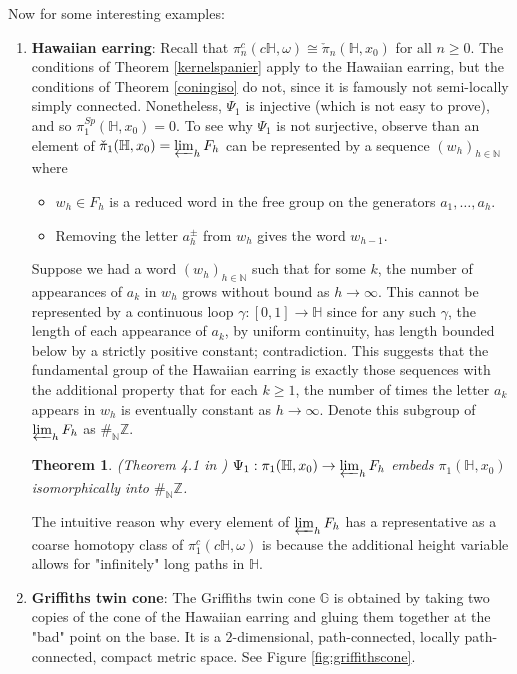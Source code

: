 \documentclass[a4paper,11pt]{article}
\theoremstyle{definition}
\theoremstyle{plain}
\newtheorem{theorem}[definition]{Theorem}
\theoremstyle{remark}
\begin{document}
{Now for some interesting examples:

\begin{enumerate}
\item \textbf{Hawaiian earring}: Recall that $\pi_{n}^{c}(c\mathbb{H},\omega) \cong \check{\pi}_{n}(\mathbb{H},x_0)$ for all $n\geq0$. The conditions of Theorem \ref{kernelspanier} apply to the Hawaiian earring, but the conditions of Theorem \ref{coningiso} do not, since it is famously not semi-locally simply connected. Nonetheless, $\Psi_{1}$ is injective (which is not easy to prove), and so $\pi_{1}^{Sp}(\mathbb{H},x_0) = 0$. To see why $\Psi_{1}$ is not surjective, observe than an element of $\check{\pi}_{1}(\mathbb{H},x_0) = \varprojlim_{h}F_h$ can be represented by a sequence $(w_h)_{h\in \mathbb{N}}$ where
\begin{itemize}
\item $w_{h}\in F_{h}$ is a reduced word in the free group on the generators $a_1,\dots, a_h$.
\item Removing the letter $a_h^{\pm}$ from $w_h$ gives the word $w_{h-1}$.
\end{itemize}

Suppose we had a word $(w_h)_{h\in \mathbb{N}}$ such that for some $k$, the number of appearances of $a_k$ in $w_{h}$ grows without bound as $h\rightarrow \infty$. This cannot be represented by a continuous loop $\gamma: [0,1]\rightarrow \mathbb{H}$ since for any such $\gamma$, the length of each appearance of $a_k$, by uniform continuity, has length bounded below by a strictly positive constant; contradiction. This suggests that the fundamental group of the Hawaiian earring is exactly those sequences with the additional property that for each $k\geq 1$, the number of times the letter $a_k$ appears in $w_{h}$ is eventually constant as $h\rightarrow \infty$. Denote this subgroup of $\varprojlim_{h} F_{h}$ as $\#_{\mathbb{N}}\mathbb{Z}$. 

\begin{theorem} (Theorem 4.1 in \cite{morgan1986van}) $\Psi_{1}: \pi_{1}(\mathbb{H},x_{0})\rightarrow \varprojlim_{h} F_{h}$ embeds $\pi_{1}(\mathbb{H}, x_{0})$ isomorphically into $\#_{\mathbb{N}}\mathbb{Z}$. 
\end{theorem}

The intuitive reason why every element of $\varprojlim_{h} F_{h}$ has a representative as a coarse homotopy class of $\pi_{1}^{c}(c\mathbb{H},\omega)$ is because the additional height variable allows for "infinitely" long paths in $\mathbb{H}$. 
\item \textbf{Griffiths twin cone}: The Griffiths twin cone $\mathbb{G}$ is obtained by taking two copies of the cone of the Hawaiian earring and gluing them together at the "bad" point on the base. It is a $2$-dimensional, path-connected, locally path-connected, compact metric space. See Figure \ref{fig:griffithscone}. 


\end{enumerate}}
\end{document}
